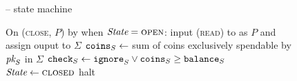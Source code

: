\begin{figure}[H]
\begin{systembox}{\fchan{} -- state machine}
\begin{algorithmic}[1]
      \State On (\textsc{close}, $P$) by \adversary when $\itistate =
      \textsc{open}$:
      \label{code:functionality:state-machine:close:prev-state}
      \Indent
        \State input (\textsc{read}) to \ledger as $P$ and assign ouput to
        $\Sigma$
        \State {}
            \State $\texttt{coins}_{S} \gets$ sum of coins exclusively spendable by
            $\textit{pk}_{S}$ in $\Sigma$
            \label{code:functionality:state-machine:close:coins}
          \EndIf
          \State $\texttt{check}_S \gets \texttt{ignore}_S \vee \texttt{coins}_{S} \geq
          \texttt{balance}_{S}$
        \EndFor
          \State $\itistate \gets \textsc{closed}$
        \Else \: 
          \State halt
          \label{code:functionality:state-machine:halt}
        \EndIf
      \EndIndent
    \end{algorithmic}
  \end{systembox}
  \caption{}
  \label{code:functionality:state-machine}
\end{figure}
